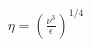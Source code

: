 \documentclass[preview]{standalone}
\begin{document}
\begin{align*}
\eta = \left( \frac{\nu^3}{\epsilon} \right)^{1/4}
\end{align*}
\end{document}
